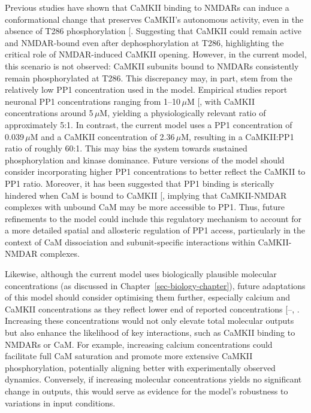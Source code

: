 \documentclass[
  11pt,
  letterpaper,
]{scrreprt}
\begin{document}
Previous studies have shown that CaMKII binding to NMDARs can induce a
conformational change that preserves CaMKII's autonomous activity, even
in the absence of T286 phosphorylation
{[}\citeproc{ref-bayer2001Interaction}{168}{]}. Suggesting that CaMKII
could remain active and NMDAR-bound even after dephosphorylation at
T286, highlighting the critical role of NMDAR-induced CaMKII opening.
However, in the current model, this scenario is not observed: CaMKII
subunits bound to NMDARs consistently remain phosphorylated at T286.
This discrepancy may, in part, stem from the relatively low PP1
concentration used in the model. Empirical studies report neuronal PP1
concentrations ranging from 1--10\,\(\mu\text{M}\)
{[}\citeproc{ref-cohen2002Protein}{446}{]}, with CaMKII concentrations
around 5\,\(\mu\text{M}\), yielding a physiologically relevant ratio of
approximately 5:1. In contrast, the current model uses a PP1
concentration of 0.039\,\(\mu\text{M}\) and a CaMKII concentration of
2.36\,\(\mu\text{M}\), resulting in a CaMKII:PP1 ratio of roughly 60:1.
This may bias the system towards sustained phosphorylation and kinase
dominance. Future versions of the model should consider incorporating
higher PP1 concentrations to better reflect the CaMKII to PP1 ratio.
Moreover, it has been suggested that PP1 binding is sterically hindered
when CaM is bound to CaMKII
{[}\citeproc{ref-pharris2019Multistate}{185}{]}, implying that
CaMKII-NMDAR complexes with unbound CaM may be more accessible to PP1.
Thus, future refinements to the model could include this regulatory
mechanism to account for a more detailed spatial and allosteric
regulation of PP1 access, particularly in the context of CaM
dissociation and subunit-specific interactions within CaMKII-NMDAR
complexes.

Likewise, although the current model uses biologically plausible
molecular concentrations (as discussed in
Chapter~\ref{sec-biology-chapter}), future adaptations of this model
should consider optimising them further, especially calcium and CaMKII
concentrations as they reflect lower end of reported concentrations
{[}--,
\citeproc{ref-otmakhov2012Measuring}{444}{]}. Increasing these
concentrations would not only elevate total molecular outputs but also
enhance the likelihood of key interactions, such as CaMKII binding to
NMDARs or CaM. For example, increasing calcium concentrations could
facilitate full CaM saturation and promote more extensive CaMKII
phosphorylation, potentially aligning better with experimentally
observed dynamics. Conversely, if increasing molecular concentrations
yields no significant change in outputs, this would serve as evidence
for the model's robustness to variations in input conditions.
\end{document}
